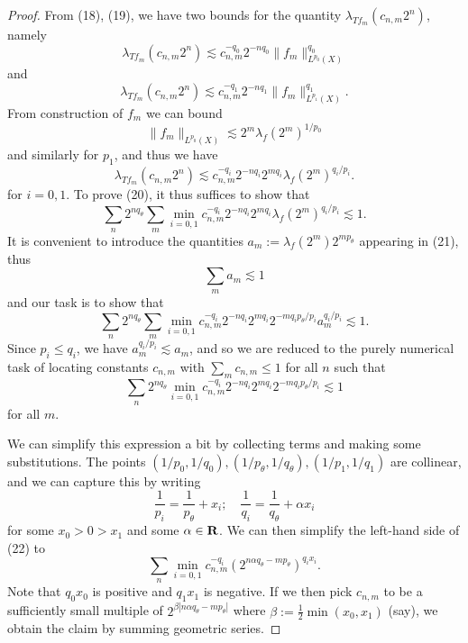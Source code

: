 \documentclass[10pt,reqno]{amsart}
\begin{document}
\begin{proof}
    From (18), (19), we have two bounds for the quantity $\lambda_{Tf_m}( c_{n,m} 2^n )$, namely
    \[ \lambda_{Tf_m}( c_{n,m} 2^n ) \lesssim c_{n,m}^{-q_0} 2^{-nq_0} \| f_m \|_{L^{p_0}(X)}^{q_0}\]
    and
    \[ \lambda_{Tf_m}( c_{n,m} 2^n ) \lesssim c_{n,m}^{-q_1} 2^{-nq_1} \| f_m \|_{L^{p_1}(X)}^{q_1}.\]
    From construction of $f_m$ we can bound
    \[ \| f_m \|_{L^{p_0}(X)} \lesssim 2^m \lambda_f(2^m)^{1/p_0}\]
    and similarly for $p_1$, and thus we have
    \[ \lambda_{Tf_m}( c_{n,m} 2^n ) \lesssim c_{n,m}^{-q_i} 2^{-nq_i} 2^{m q_i} \lambda_f(2^m)^{q_i/p_i}.\]
    for $i=0,1$. To prove (20), it thus suffices to show that
    \[ \sum_n 2^{n q_\theta} \sum_m \min_{i=0,1} c_{n,m}^{-q_i} 2^{-nq_i} 2^{m q_i} \lambda_f(2^m)^{q_i/p_i} \lesssim 1.\]
    It is convenient to introduce the quantities $a_m := \lambda_f(2^m) 2^{m p_\theta}$ appearing in (21), thus
    \[ \sum_m a_m \lesssim 1\]
    and our task is to show that
    \[ \sum_n 2^{n q_\theta} \sum_m \min_{i=0,1} c_{n,m}^{-q_i} 2^{-nq_i} 2^{m q_i} 2^{-m q_i p_\theta / p_i} a_m^{q_i/p_i} \lesssim 1.\]
    Since $p_i \leq q_i$, we have $a_m^{q_i/p_i} \lesssim a_m$, and so we are reduced to the purely numerical task of locating constants $c_{n,m}$ with $\sum_m c_{n,m} \leq 1$ for all $n$ such that
    \begin{equation} \sum_n 2^{n q_\theta} \min_{i=0,1} c_{n,m}^{-q_i} 2^{-nq_i} 2^{m q_i} 2^{-m q_i p_\theta / p_i} \lesssim 1 \end{equation}
    for all $m$.

    We can simplify this expression a bit by collecting terms and making some substitutions. The points $(1/p_0,1/q_0), (1/p_\theta,1/q_\theta), (1/p_1,1/q_1)$ are collinear, and we can capture this by writing
    \[ \frac{1}{p_i} = \frac{1}{p_\theta} + x_i; \quad \frac{1}{q_i} = \frac{1}{q_\theta} + \alpha x_i\]
    for some $x_0 > 0 > x_1$ and some $\alpha \in {\bf R}$. We can then simplify the left-hand side of (22) to
    \[ \sum_{n} \min_{i=0,1} c_{n,m}^{-q_i} (2^{n \alpha q_\theta - m p_\theta})^{q_i x_i}.\]
    Note that $q_0 x_0$ is positive and $q_1 x_1$ is negative. If we then pick $c_{n,m}$ to be a sufficiently small multiple of $2^{\beta |n \alpha q_\theta - m p_\theta|}$ where $\beta := \frac{1}{2} \min(x_0,x_1)$ (say), we obtain the claim by summing geometric series.
\end{proof}
\end{document}
